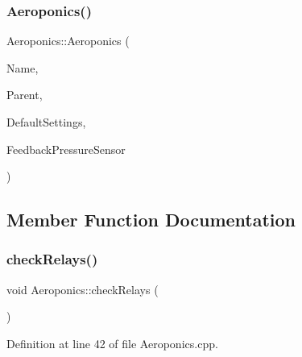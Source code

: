 \subsubsection{\texorpdfstring{Aeroponics()}{Aeroponics()}\hspace{0.1cm}{\footnotesize\ttfamily [2/2]}}
{\footnotesize\ttfamily Aeroponics\+::\+Aeroponics (\begin{DoxyParamCaption}\item[{const \+\_\+\+\_\+\+Flash\+String\+Helper $\ast$}]{Name,  }\item[{\hyperlink{class_module}{Module} $\ast$}]{Parent,  }\item[{\hyperlink{struct_settings_1_1_aeroponics_settings}{Settings\+::\+Aeroponics\+Settings} $\ast$}]{Default\+Settings,  }\item[{\hyperlink{class_pressure_sensor}{Pressure\+Sensor} $\ast$}]{Feedback\+Pressure\+Sensor }\end{DoxyParamCaption})}



\subsection{Member Function Documentation}
\mbox{\label{class_aeroponics_a0f70505e6b8722985f6ab52f17595cdd}} 
\subsubsection{\texorpdfstring{check\+Relays()}{checkRelays()}\hspace{0.1cm}{\footnotesize\ttfamily [1/2]}}
{\footnotesize\ttfamily void Aeroponics\+::check\+Relays (\begin{DoxyParamCaption}{ }\end{DoxyParamCaption})\hspace{0.3cm}{\ttfamily [protected]}}



Definition at line 42 of file Aeroponics.\+cpp.

